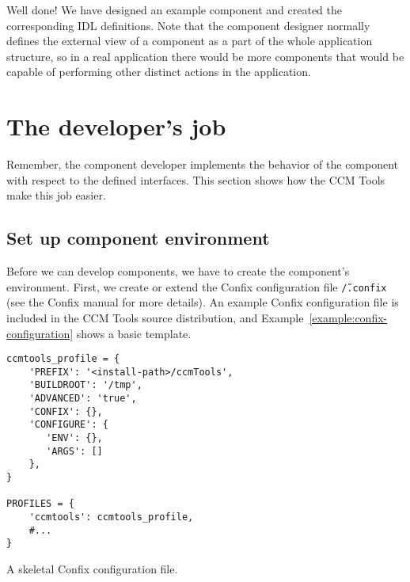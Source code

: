Well done! We have designed an example component and created the corresponding
IDL definitions. Note that the component designer normally defines the external
view of a component as a part of the whole application structure, so in a real
application there would be more components that would be capable of performing
other distinct actions in the application.

\section{The developer's job}

Remember, the component developer implements the behavior of the component with
respect to the defined interfaces. This section shows how the CCM Tools make
this job easier.

\subsection{Set up component environment}

Before we can develop components, we have to create the component's environment.
First, we create or extend the Confix configuration file {\tt \~/.confix} (see
the Confix manual for more details). An example Confix configuration file is
included in the CCM Tools source distribution, and
Example~\ref{example:confix-configuration} shows a basic template.
\begin{Example}
\begin{minifbox}
\begin{small}
\begin{verbatim}
ccmtools_profile = {
    'PREFIX': '<install-path>/ccmTools',
    'BUILDROOT': '/tmp',
    'ADVANCED': 'true',
    'CONFIX': {},
    'CONFIGURE': {
       'ENV': {},
       'ARGS': []
    },
}

PROFILES = {
    'ccmtools': ccmtools_profile,
    #...
}
\end{verbatim}
\end{small}
\end{minifbox}
\caption{A skeletal Confix configuration file.}
\label{example:confix-configuration}
\end{Example}

